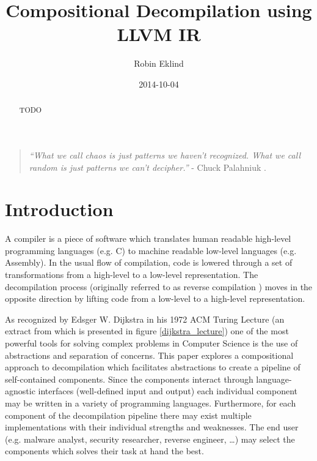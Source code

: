 \documentclass[12pt, a4paper]{article}
\title{Compositional Decompilation using LLVM IR}
\author{Robin Eklind}
\date{2014-10-04} %
\begin{document}
\maketitle

\begin{abstract}
TODO
\end{abstract}

\vfill

\begin{quote}
	\textit{``What we call chaos is just patterns we haven't recognized. What we call random is just patterns we can't decipher.''} - Chuck Palahniuk \cite{patterns_quote}.
\end{quote}

\pagebreak





\tableofcontents

\pagebreak



\section{Introduction}

A compiler is a piece of software which translates human readable high-level programming languages (e.g. C) to machine readable low-level languages (e.g. Assembly). In the usual flow of compilation, code is lowered through a set of transformations from a high-level to a low-level representation. The decompilation process (originally referred to as reverse compilation \cite{rev_comp}) moves in the opposite direction by lifting code from a low-level to a high-level representation.

As recognized by Edsger W. Dijkstra in his 1972 ACM Turing Lecture (an extract from which is presented in figure \ref{dijkstra_lecture}) one of the most powerful tools for solving complex problems in Computer Science is the use of abstractions and separation of concerns. This paper explores a compositional approach to decompilation which facilitates abstractions to create a pipeline of self-contained components. Since the components interact through language-agnostic interfaces (well-defined input and output) each individual component may be written in a variety of programming languages. Furthermore, for each component of the decompilation pipeline there may exist multiple implementations with their individual strengths and weaknesses. The end user (e.g. malware analyst, security researcher, reverse engineer, …) may select the components which solves their task at hand the best.
\end{document}
